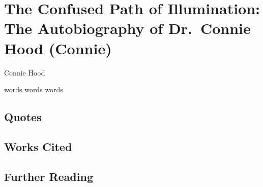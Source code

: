 \chapter{The Confused Path of Illumination: The Autobiography of Dr.\ Connie Hood (Connie)}

\begin{authors}
	Connie Hood
\end{authors}

words words words


\section{Quotes}

\section{Works Cited}

\section{Further Reading}


